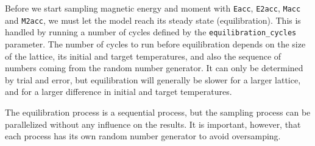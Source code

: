 \documentclass[]{article}
\begin{document}
Before we start sampling magnetic energy and moment with \lstinline|Eacc|, \lstinline|E2acc|, \lstinline|Macc| and \lstinline|M2acc|, we must let the model reach its steady state (equilibration). This is handled by running a number of cycles defined by the \lstinline|equilibration_cycles| parameter. The number of cycles to run before equilibration depends on the size of the lattice, its initial and target temperatures, and also the sequence of numbers coming from the random number generator. It can only be determined by trial and error, but equilibration will generally be slower for a larger lattice, and for a larger difference in initial and target temperatures.

The equilibration process is a sequential process, but the sampling process can be parallelized without any influence on the results. It is important, however, that each process has its own random number generator to avoid oversamping.
\end{document}
